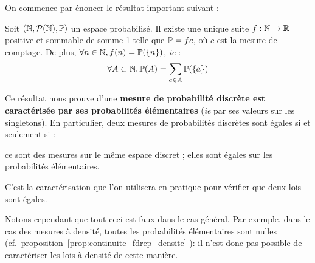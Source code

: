 \documentclass[../integ-proba.tex]{subfiles}
\begin{document}
    On commence par énoncer le résultat important suivant :

    \begin{thm}
        \label{thm:avantage_discret}
        Soit $\left(\mathbb{N}, \mathcal{P}(\mathbb{N}), \mathbb{P} \right)$ un espace probabilisé.
        Il existe une unique suite $f:\mathbb{N} \rightarrow \mathbb{R}$ positive et sommable de somme 1 telle que $\mathbb{P} = f c$, où $c$ est la mesure de comptage.
        De plus, $\forall n \in \mathbb{N}, f(n)=\mathbb{P}(\left\{n\right\})$, \textit{ie} :
        \begin{displaymath}
            \forall A \subset \mathbb{N}, \mathbb{P}(A) = \sum_{a \in A} \mathbb{P}(\left\{ a \right\})
        \end{displaymath}
    \end{thm}

    \begin{rem}
        \label{rem:discretes}
        Ce résultat nous prouve d'une \textbf{mesure de probabilité discrète est caractérisée par ses probabilités élémentaires} (\textit{ie} par ses valeurs sur les singletons).
        En particulier, deux mesures de probabilités discrètes sont égales si et seulement si :
        \begin{itemize}
            \itemb ce sont des mesures sur le même espace discret ;
            \itemb elles sont égales sur les probabilités élémentaires.
        \end{itemize}
        C'est la caractérisation que l'on utilisera en pratique pour vérifier que deux lois sont égales.

        Notons cependant que tout ceci est faux dans le cas général.
        Par exemple, dans le cas des mesures à densité, toutes les probabilités élémentaires sont nulles (cf.\ proposition~\ref{prop:continuite_fdrep_densite} ): il n'est donc pas possible de caractériser les lois à densité de cette manière.
    \end{rem}

\end{document}
